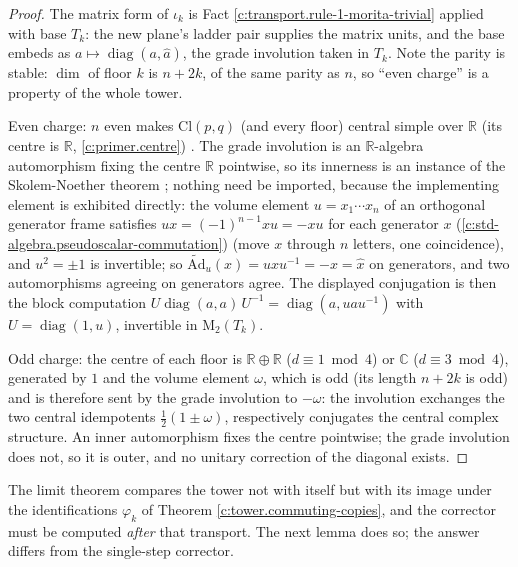 \documentclass[11pt]{article}
\theoremstyle{definition}
\theoremstyle{plain}
\providecommand{\Ad}{}\renewcommand{\Ad}{\widetilde{\mathrm{Ad}}}
\providecommand{\C}{}\renewcommand{\C}{\mathbb{C}}
\providecommand{\Cl}{}\renewcommand{\Cl}{\mathrm{Cl}}
\providecommand{\Mat}{}\renewcommand{\Mat}{\mathrm{M}}
\providecommand{\R}{}\renewcommand{\R}{\mathbb{R}}
\begin{document}
\begin{proof}
The matrix form of $\iota_k$ is Fact \ref{c:transport.rule-1-morita-trivial} applied with base $T_k$: the new plane's ladder pair supplies the matrix units, and the base embeds as $a \mapsto \operatorname{diag}(a, \hat a)$, the grade involution taken in $T_k$. Note the parity is stable: $\dim$ of floor $k$ is $n + 2k$, of the same parity as $n$, so ``even charge'' is a property of the whole tower.

Even charge: $n$ even makes $\Cl(p,q)$ (and every floor) central simple over $\R$ (its centre is $\R$, \ref{c:primer.centre}) \cite{Porteous1995, Lounesto2001}. The grade involution is an $\R$-algebra automorphism fixing the centre $\R$ pointwise, so its innerness is an instance of the Skolem-Noether theorem \cite{Pierce1982}; nothing need be imported, because the implementing element is exhibited directly: the volume element $u = x_1 \cdots x_n$ of an orthogonal generator frame satisfies $u x = (-1)^{n-1} x u = -xu$ for each generator $x$ (\ref{c:std-algebra.pseudoscalar-commutation}) (move $x$ through $n$ letters, one coincidence), and $u^2 = \pm 1$ is invertible; so $\Ad_u(x) = u x u^{-1} = -x = \hat x$ on generators, and two automorphisms agreeing on generators agree. The displayed conjugation is then the block computation $U \operatorname{diag}(a,a)\, U^{-1} = \operatorname{diag}(a, u a u^{-1})$ with $U = \operatorname{diag}(1, u)$, invertible in $\Mat_2(T_k)$.

Odd charge: the centre of each floor is $\R \oplus \R$ ($d \equiv 1 \bmod 4$) or $\C$ ($d \equiv 3 \bmod 4$), generated by $1$ and the volume element $\omega$, which is odd (its length $n + 2k$ is odd) and is therefore sent by the grade involution to $-\omega$: the involution exchanges the two central idempotents $\tfrac12(1 \pm \omega)$, respectively conjugates the central complex structure. An inner automorphism fixes the centre pointwise; the grade involution does not, so it is outer, and no unitary correction of the diagonal exists.

\end{proof}

\label{c:note.tower.setting-car-limit}
The limit theorem compares the tower not with itself but with its image under the identifications $\varphi_k$ of Theorem \ref{c:tower.commuting-copies}, and the corrector must be computed \emph{after} that transport. The next lemma does so; the answer differs from the single-step corrector.
\end{document}
